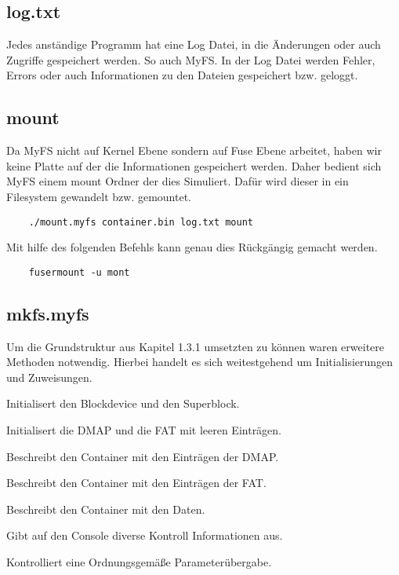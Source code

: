 \subsection{log.txt}
Jedes anständige Programm hat eine Log Datei, in die Änderungen oder auch Zugriffe gespeichert werden. So auch MyFS. In der Log Datei werden Fehler, Errors oder auch Informationen zu den Dateien gespeichert bzw. geloggt.

\subsection{mount}
Da MyFS nicht auf Kernel Ebene sondern auf Fuse Ebene arbeitet, haben wir keine Platte auf der die Informationen gespeichert werden. Daher bedient sich MyFS einem mount Ordner der dies Simuliert. Dafür wird dieser in ein Filesystem gewandelt  bzw. gemountet. 
\begin{center}
	\begin{lstlisting}
	./mount.myfs container.bin log.txt mount
	\end{lstlisting}
\end{center}
Mit hilfe des folgenden Befehls kann genau dies Rückgängig gemacht werden.
\begin{center}
	\begin{lstlisting}
	fusermount -u mont
	\end{lstlisting}
\end{center}
\subsection{mkfs.myfs}
Um die Grundstruktur aus Kapitel 1.3.1 umsetzten zu können waren erweitere Methoden notwendig. Hierbei handelt es sich weitestgehend um Initialisierungen und Zuweisungen. 
\begin{description}[align=right,labelwidth=5cm]
	\item[\textbf{initializeObjects()}] Initialisert den Blockdevice und den Superblock.
	\item[\textbf{initDMapAndFat()}] Initialisert die DMAP und die FAT mit leeren Einträgen.
	\item[\textbf{writeSuperBlockToContainer()}] Beschreibt den Container mit den Einträgen der DMAP.
	\item[\textbf{writeFatToContainer()}] Beschreibt den Container mit den Einträgen der FAT.
	\item[\textbf{writeFilesToContainer()}] Beschreibt den Container mit den Daten.
	\item[\textbf{print()}] Gibt auf den Console diverse Kontroll Informationen aus.
	\item[\textbf{inputChecks()}] Kontrolliert eine Ordnungsgemäße Parameterübergabe.
\end{description} 

